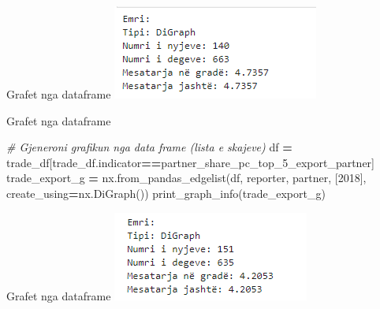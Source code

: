 \documentclass[
  ignorenonframetext,
]{beamer}
\newenvironment{Shaded}{\begin{snugshade}}{\end{snugshade}}
\newcommand{\CommentTok}[1]{\textcolor[rgb]{0.56,0.35,0.01}{\textit{#1}}}
\newcommand{\NormalTok}[1]{#1}
\newcommand{\OperatorTok}[1]{\textcolor[rgb]{0.81,0.36,0.00}{\textbf{#1}}}
\newcommand{\StringTok}[1]{\textcolor[rgb]{0.31,0.60,0.02}{#1}}
\begin{document}
\begin{frame}{Grafet nga dataframe}
\protect\hypertarget{grafet-nga-dataframe-1}{}
\includegraphics{./Figs/trade3.png}
\end{frame}

\begin{frame}[fragile]{Grafet nga dataframe}
\protect\hypertarget{grafet-nga-dataframe-2}{}

\begin{Shaded}
\begin{Highlighting}[]
\CommentTok{\# Gjeneroni grafikun nga data frame  (lista e skajeve)}
\NormalTok{df }\OperatorTok{=}\NormalTok{ trade\_df[trade\_df.indicator}\OperatorTok{==}\StringTok{\textquotesingle{}partner\_share\_pc\_top\_5\_export\_partner\textquotesingle{}}\NormalTok{]}
\NormalTok{trade\_export\_g }\OperatorTok{=}\NormalTok{ nx.from\_pandas\_edgelist(df, }\StringTok{\textquotesingle{}reporter\textquotesingle{}}\NormalTok{, }\StringTok{\textquotesingle{}partner\textquotesingle{}}\NormalTok{, [}\StringTok{\textquotesingle{}2018\textquotesingle{}}\NormalTok{], create\_using}\OperatorTok{=}\NormalTok{nx.DiGraph())}
\NormalTok{print\_graph\_info(trade\_export\_g)}
\end{Highlighting}
\end{Shaded}
\end{frame}

\begin{frame}{Grafet nga dataframe}
\protect\hypertarget{grafet-nga-dataframe-3}{}
\includegraphics{./Figs/trade4.png}
\end{frame}
\end{document}
